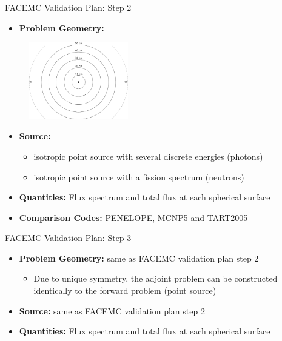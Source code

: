 \documentclass{beamer}
\begin{document}
\begin{frame}{FACEMC Validation Plan: Step 2}
  
  \begin{itemize}
    \item \textbf{Problem Geometry:}
  \end{itemize}
      
  \begin{figure}[h!]
    \begin{center}
      \includegraphics[width=1.7in]{figures/code_comparison_problem.pdf}
    \end{center}
  \end{figure}

  \begin{itemize}
    \item \textbf{Source:}
      \begin{itemize}
        \item isotropic point source with several discrete energies (photons)
        \item isotropic point source with a fission spectrum (neutrons)
      \end{itemize}
      \medskip
    \item \textbf{Quantities:} Flux spectrum and total flux at each spherical 
      surface
      \medskip
    \item \textbf{Comparison Codes:} PENELOPE, MCNP5 and TART2005 
  \end{itemize}
  
\end{frame}

\begin{frame}{FACEMC Validation Plan: Step 3}

  \begin{itemize}
    \item \textbf{Problem Geometry:} same as FACEMC validation plan step 2
      \begin{itemize}
        \item Due to unique symmetry, the adjoint problem can be constructed 
          identically to the forward problem (point source)
      \end{itemize}
      \bigskip
      \bigskip
    \item \textbf{Source:} same as FACEMC validation plan step 2
      \bigskip
      \bigskip
    \item \textbf{Quantities:} Flux spectrum and total flux at each spherical 
      surface

  \end{itemize}    

\end{frame}
\end{document}
